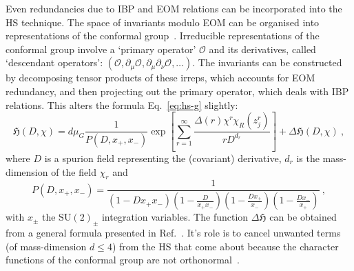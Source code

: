 Even redundancies due to IBP and EOM relations can be incorporated into the HS
technique. The space of invariants modulo EOM can be organised into
representations of the conformal group~\cite{Henning:2017fpj, Henning:2015alf}.
Irreducible representations of the conformal group involve a `primary operator'
$\mathcal{O}$ and its derivatives, called `descendant operators':
$(\mathcal{O}, \partial_{\mu}\mathcal{O}, \partial_{\mu}\partial_{\nu}\mathcal{O}, \ldots)$.
The invariants can be constructed by decomposing tensor products of these
irreps, which accounts for EOM redundancy, and then projecting out the primary
operator, which deals with IBP relations. This alters the formula
Eq.~\eqref{eq:hs-g} slightly:
\begin{equation}
  \label{eq:hs-full}
  \mathfrak{H}(D, \chi) = d\mu_{G} \frac{1}{P(D, x_{+}, x_{-})} \exp \left[ \sum_{r=1}^{\infty} \frac{\Delta(r) \chi^{r} \chi_{R}(z_{j}^{r})}{r D^{d_{r}}} \right] + \Delta \mathfrak{H}(D, \chi) \ ,
\end{equation}
where $D$ is a spurion field representing the (covariant) derivative, $d_{r}$ is
the mass-dimension of the field $\chi_{r}$ and
\begin{equation}
  P(D, x_{+}, x_{-}) = \frac{1}{(1-Dx_{+}x_{-})\left(1-\frac{D}{x_{+}x_{-}}\right)\left(1-\frac{Dx_{+}}{x_{-}}\right)\left(1 - \frac{Dx_{-}}{x_{+}}\right)} \ ,
\end{equation}
with $x_{\pm}$ the $\mathrm{SU}(2)_{\pm}$ integration variables. The function
$\Delta \mathfrak{H}$ can be obtained from a general formula presented in
Ref.~\cite{Henning:2017fpj}. It's role is to cancel unwanted terms (of mass-dimension
$d \leq 4$) from the HS that come about because the character functions of the
conformal group are not orthonormal~\cite{Henning:2017fpj}.

